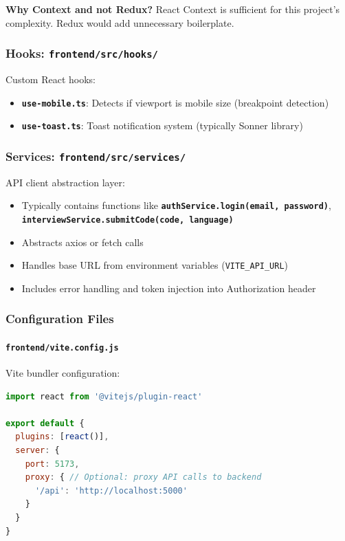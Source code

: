 \documentclass[12pt,a4paper,oneside]{article}
\newcommand{\fileref}[1]{\texttt{#1}}
\newcommand{\funcname}[1]{\texttt{\textbf{#1}}}
\newcommand{\varname}[1]{\texttt{#1}}
\begin{document}
\textbf{Why Context and not Redux?} React Context is sufficient for this project's complexity. Redux would add unnecessary boilerplate.

\subsubsection{Hooks: \fileref{frontend/src/hooks/}}

Custom React hooks:

\begin{itemize}
    \item \funcname{use-mobile.ts}: Detects if viewport is mobile size (breakpoint detection)
    \item \funcname{use-toast.ts}: Toast notification system (typically Sonner library)
\end{itemize}

\subsubsection{Services: \fileref{frontend/src/services/}}

API client abstraction layer:

\begin{itemize}
    \item Typically contains functions like \funcname{authService.login(email, password)}, \funcname{interviewService.submitCode(code, language)}
    \item Abstracts axios or fetch calls
    \item Handles base URL from environment variables (\varname{VITE\_API\_URL})
    \item Includes error handling and token injection into Authorization header
\end{itemize}

\subsubsection{Configuration Files}

\paragraph{\fileref{frontend/vite.config.js}}

Vite bundler configuration:
\begin{lstlisting}[language=JavaScript]
import react from '@vitejs/plugin-react'

export default {
  plugins: [react()],
  server: {
    port: 5173,
    proxy: { // Optional: proxy API calls to backend
      '/api': 'http://localhost:5000'
    }
  }
}
\end{lstlisting}
\end{document}

